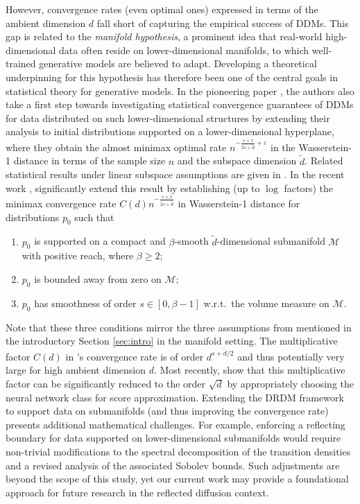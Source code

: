 \documentclass[a4paper, 11pt, headings = small, abstract]{scrartcl}
\begin{document}
However, convergence rates (even optimal ones) expressed in terms of the ambient dimension $d$ fall short of capturing the empirical success of DDMs. This gap is related to the \emph{manifold hypothesis}, a prominent idea that real-world high-dimensional data often reside on lower-dimensional manifolds, to which well-trained generative models are believed to adapt. Developing a theoretical underpinning for this hypothesis has therefore been one of the central goals in statistical theory for generative models. 
In the pioneering paper \cite{oko23}, the authors also take a first step towards investigating statistical convergence guarantees of DDMs for data distributed on such lower-dimensional structures by extending their analysis to initial distributions supported on a lower-dimensional hyperplane, where they obtain the almost minimax optimal rate $n^{-\frac{s+1}{2s + \tilde{d}} + \varepsilon}$ in the Wasserstein-1 distance in terms of the sample size $n$ and the subspace dimension $\tilde{d}$. Related statistical results under linear subspace assumptions are given in \cite{chen23b}. In the recent work \cite{tang24}, \citeauthor{tang24} significantly extend this result by establishing (up to $\log$ factors) the minimax convergence rate $C(d) n^{-\frac{s+1}{2s + \tilde{d}}}$ in Wasserstein-1 distance for distributions $p_0$ such that 
\begin{enumerate}[label = (\roman*)]
\item $p_0$ is supported on a compact and $\beta$-smooth $\tilde{d}$-dimensional submanifold $\mathcal{M}$ with positive reach, where $\beta \geq 2$;
\item $p_0$ is bounded away from zero on $\mathcal{M}$;
\item $p_0$ has smoothness of order $s \in [0,\beta-1]$ w.r.t.\ the volume measure on $\mathcal{M}$.
\end{enumerate}
Note that these three conditions mirror the three assumptions from \cite{oko23} mentioned in the introductory Section \ref{sec:intro} in the manifold setting. 
The multiplicative factor $C(d)$ in \cite{tang24}'s convergence rate is of order $d^{s +\tilde{d}/2}$ and thus potentially very large for high ambient dimension $d$.
Most recently, \cite{azangulov24} show that this multiplicative factor can be significantly reduced to the order $\sqrt{d}$ by appropriately choosing the neural network class for score approximation. Extending the DRDM framework to support data on submanifolds (and thus improving the convergence rate) presents additional mathematical challenges. For example, enforcing a reflecting boundary for data supported on lower-dimensional submanifolds would require non-trivial modifications to the spectral decomposition of the transition densities and a revised analysis of the associated Sobolev bounds. Such adjustments are beyond the scope of this study, yet our current work may provide a foundational approach for future research in the reflected diffusion context.
\end{document}
